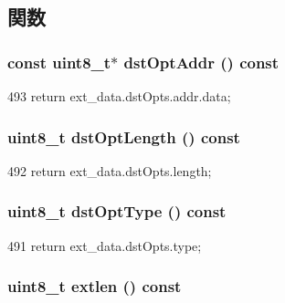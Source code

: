 \subsection{関数}
\hypertarget{structNet_1_1Ip6Opt_a7e470ca7eb55174fbce80124e7604633}{
\subsubsection[{dstOptAddr}]{\setlength{\rightskip}{0pt plus 5cm}const uint8\_\-t$\ast$ dstOptAddr () const}}
\label{structNet_1_1Ip6Opt_a7e470ca7eb55174fbce80124e7604633}



\begin{DoxyCode}
493 { return ext_data.dstOpts.addr.data; }
\end{DoxyCode}
\hypertarget{structNet_1_1Ip6Opt_a6ee761d697e9f0054f319129b91e262e}{
\subsubsection[{dstOptLength}]{\setlength{\rightskip}{0pt plus 5cm}uint8\_\-t dstOptLength () const}}
\label{structNet_1_1Ip6Opt_a6ee761d697e9f0054f319129b91e262e}



\begin{DoxyCode}
492 { return ext_data.dstOpts.length; }
\end{DoxyCode}
\hypertarget{structNet_1_1Ip6Opt_aa05fb424a60fa702a51de9d9910be690}{
\subsubsection[{dstOptType}]{\setlength{\rightskip}{0pt plus 5cm}uint8\_\-t dstOptType () const}}
\label{structNet_1_1Ip6Opt_aa05fb424a60fa702a51de9d9910be690}



\begin{DoxyCode}
491 { return ext_data.dstOpts.type; }
\end{DoxyCode}
\hypertarget{structNet_1_1Ip6Opt_a7534c13a4cde0c08f78d23e82ae8a95a}{
\subsubsection[{extlen}]{\setlength{\rightskip}{0pt plus 5cm}uint8\_\-t extlen () const}}
\label{structNet_1_1Ip6Opt_a7534c13a4cde0c08f78d23e82ae8a95a}



